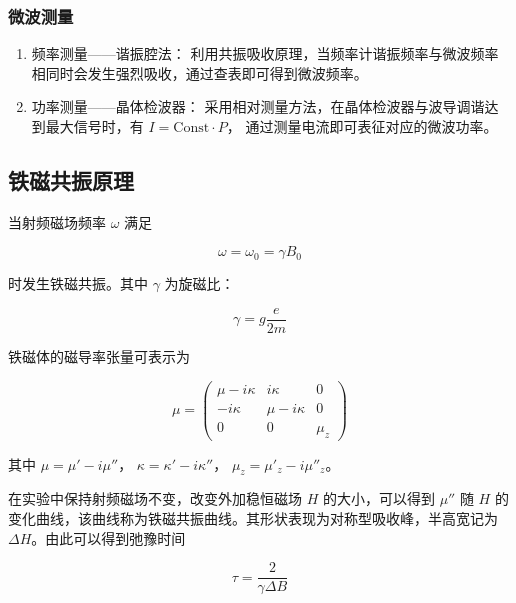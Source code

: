 \documentclass[a4paper, 1.5lines]{ctexart}
\begin{document}
\subsubsection{微波测量}

\begin{enumerate}

\item 频率测量——谐振腔法：  
利用共振吸收原理，当频率计谐振频率与微波频率相同时会发生强烈吸收，通过查表即可得到微波频率。

\item 功率测量——晶体检波器：  
采用相对测量方法，在晶体检波器与波导调谐达到最大信号时，有
$I = \text{Const}\cdot P$，
通过测量电流即可表征对应的微波功率。

\end{enumerate}

\subsection{铁磁共振原理}

当射频磁场频率 $\omega$ 满足

\begin{equation}
\omega = \omega_0 = \gamma B_0
\end{equation}

时发生铁磁共振。其中 $\gamma$ 为旋磁比：

\begin{equation}
\gamma = g\frac{e}{2m}
\end{equation}

铁磁体的磁导率张量可表示为

\begin{equation}
\mu =
\begin{pmatrix}
\mu - i\kappa & i\kappa & 0 \\
- i\kappa & \mu - i\kappa & 0 \\
0 & 0 & \mu_z
\end{pmatrix}
\end{equation}

其中  
$\mu = \mu' - i\mu''$，  
$\kappa = \kappa' - i\kappa''$，  
$\mu_z = \mu'_z - i\mu''_z$。

在实验中保持射频磁场不变，改变外加稳恒磁场 $H$ 的大小，可以得到 $\mu''$ 随 $H$ 的变化曲线，该曲线称为铁磁共振曲线。其形状表现为对称型吸收峰，半高宽记为 $\Delta H$。由此可以得到弛豫时间

\begin{equation}
\tau = \frac{2}{\gamma \Delta B}
\end{equation}
\end{document}
